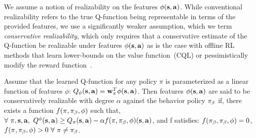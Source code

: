 We assume a notion of realizability on the features $\phi(\mathbf{s},\mathbf{a})$. While conventional realizability refers to the true Q-function being representable in terms of the provided features, we use a significantly weaker assumption, which we term \emph{conservative realizability}, which only requires that a conservative estimate of the Q-function be realizable under features $\phi(\mathbf{s}, \mathbf{a})$ as is the case with offline RL methods that learn lower-bounds on the value function~(\eg CQL) or pessimistically modify the reward function~\citep{?}.  
\begin{definition}
Assume that the learned Q-function for any policy $\pi$ is parameterized as a linear function of features $\phi$: $Q_\phi(\mathbf{s}, \mathbf{a}) = {\mathbf{w}}_\pi^T \phi(\mathbf{s},\mathbf{a})$. Then features $\phi(\mathbf{s}, \mathbf{a})$ are said to be conservatively realizable with degree $\alpha$ against the behavior policy ${\pi_\beta}$ if, there exists a function $f(\pi, {\pi_\beta}, \phi)$ such that, $\forall~ \pi, \mathbf{s}, \mathbf{a},~ Q^\phi(\mathbf{s}, \mathbf{a}) \geq Q_\pi(\mathbf{s}, \mathbf{a}) - \alpha f(\pi, {\pi_\beta}, \phi)(\mathbf{s}, \mathbf{a})$, and f satisfies: $f({\pi_\beta}, {\pi_\beta}, \phi) = 0$, $f(\pi, {\pi_\beta}, \phi) > 0 ~\forall~ \pi \neq {\pi_\beta}$.  
\end{definition}

